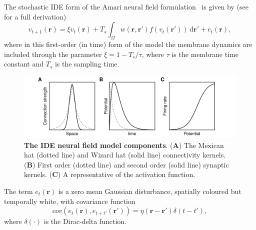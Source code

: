 \documentclass[review,authoryear,3p]{elsarticle}
\begin{document}
The stochastic IDE form of the Amari neural field formulation~\cite{Amari1977} is given by (see~\cite{Freestone2011} for a full derivation)
\begin{equation}\label{eq:DiscreteTimeModel}
	v_{t+1}\left(\mathbf{r}\right) = 
	\xi v_t\left(\mathbf{r}\right) + 
	T_s \int_\Omega { 
	    w\left(\mathbf{r},\mathbf{r'}\right)
	    f\left(v_t\left(\mathbf{r}'\right)\right) 
	\, \mathrm{d}\mathbf{r}'} 
	+ e_t\left(\mathbf{r}\right), 
\end{equation}
where in this first-order (in time) form of the model the membrane dynamics are included through the parameter $\xi=1-T_s/\tau$, where $\tau$ is the membrane time constant and $T_s$ is the sampling time. 
\begin{figure}[!t]
\centering
\includegraphics[scale=1]{./Graph/ModelComponents.pdf}
\caption{ {\bf The IDE neural field model components}. (\textbf{A}) The Mexican hat (dotted line) and Wizard hat (solid line) connectivity kernels. (\textbf{B}) First order (dotted line) and second order (solid line) synaptic kernels. (\textbf{C}) A representative of the activation function.}
\label{fig:Modelcomponents}
\end{figure}

The term $e_t(\mathbf r)$ is a zero mean Gaussian disturbance, spatially coloured but temporally white, with covariance function 
\begin{equation}
cov\left(e_{t}\left(\mathbf{r}\right),e_{t+t'}\left(\mathbf{r'}\right)\right)=\eta(\mathbf{r}-\mathbf{r'})\delta(t-t'),
\label{eq:FieldDisturbance}
\end{equation}
where $\delta(\cdot)$ is the Dirac-delta function. %
\end{document}
